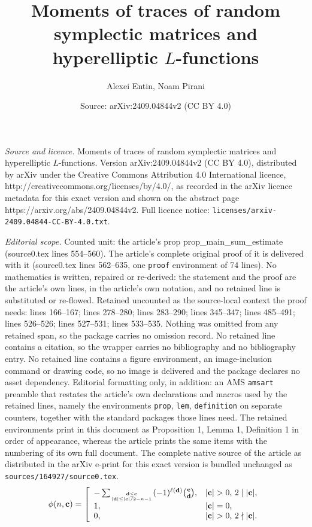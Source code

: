 \documentclass[10pt,a4paper]{amsart}
\title{Moments of traces of random symplectic matrices and hyperelliptic $L$-functions}
\author{Alexei Entin, Noam Pirani}
\date{Source: arXiv:2409.04844v2 (CC BY 4.0)}
\begin{document}
\maketitle

\noindent\emph{Source and licence.} Moments of traces of random symplectic matrices and hyperelliptic $L$-functions. Version arXiv:2409.04844v2 (CC BY 4.0), distributed by arXiv under the Creative Commons Attribution 4.0 International licence, http://creativecommons.org/licenses/by/4.0/, as recorded in the arXiv licence metadata for this exact version and shown on the abstract page https://arxiv.org/abs/2409.04844v2. Full licence notice: \texttt{licenses/arxiv-2409.04844-CC-BY-4.0.txt}.\par\smallskip

\noindent\textit{Editorial scope.} Counted unit: the article's prop prop\_main\_sum\_estimate (source0.tex lines 554--560). The article's complete original proof of it is delivered with it (source0.tex lines 562--635, one \texttt{proof} environment of 74 lines). No mathematics is written, repaired or re-derived: the statement and the proof are the article's own lines, in the article's own notation, and no retained line is substituted or re-flowed.  Retained uncounted as the source-local context the proof needs: lines 166--167; lines 278--280; lines 283--290; lines 345--347; lines 485--491; lines 526--526; lines 527--531; lines 533--535.  Nothing was omitted from any retained span, so the package carries no omission record.  No retained line contains a citation, so the wrapper carries no bibliography and no bibliography entry.  No retained line contains a figure environment, an image-inclusion command or drawing code, so no image is delivered and the package declares no asset dependency.  Editorial formatting only, in addition: an AMS \texttt{amsart} preamble that restates the article's own declarations and macros used by the retained lines, namely the environments \texttt{prop}, \texttt{lem}, \texttt{definition} on separate counters, together with the standard packages those lines need.  The retained environments print in this document as Proposition 1, Lemma 1, Definition 1 in order of appearance, whereas the article prints the same items with the numbering of its own full document.  The complete native source of the article as distributed in the arXiv e-print for this exact version is bundled unchanged as \texttt{sources/164927/source0.tex}.
\begin{equation}\label{eq: def phi}\phi(n,\mathbf c)=\left[\begin{array}{ll}
-\sum_{\mathbf d\le\mathbf c\atop{|\mathbf d|\le{|\mathbf c|}/2-n-1}}(-1)^{\ell(\mathbf d)}{\mathbf c\choose\mathbf d},&|\mathbf c|>0,\,2\mid |\mathbf c|,\\1,&|\mathbf c|=0, \\0,&|\mathbf c|>0,\,2\nmid|\mathbf c|. \end{array}\right.\end{equation}
\end{document}
